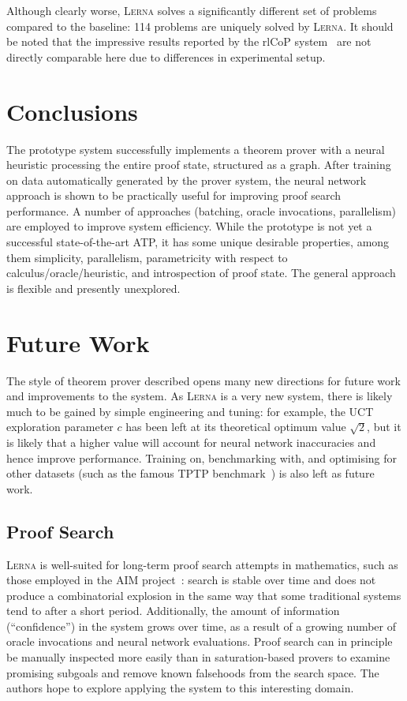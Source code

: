 \documentclass[runningheads]{llncs}
\newcommand{\lerna}{\textsc{Lerna}}
\begin{document}
Although clearly worse, \lerna{} solves a significantly different set of problems compared to the baseline: 114 problems are uniquely solved by \lerna{}.
It should be noted that the impressive results reported by the rlCoP system~\cite{rlCoP} are not directly comparable here due to differences in experimental setup.

\section{Conclusions}
The prototype system successfully implements a theorem prover with a neural heuristic processing the entire proof state, structured as a graph.
After training on data automatically generated by the prover system, the neural network approach is shown to be practically useful for improving proof search performance.
A number of approaches (batching, oracle invocations, parallelism) are employed to improve system efficiency.
While the prototype is not yet a successful state-of-the-art ATP, it has some unique desirable properties, among them simplicity, parallelism, parametricity with respect to calculus/oracle/heuristic, and introspection of proof state.
The general approach is flexible and presently unexplored.

\section{Future Work}
The style of theorem prover described opens many new directions for future work and improvements to the system.
As \lerna{} is a very new system, there is likely much to be gained by simple engineering and tuning: for example, the UCT exploration parameter \(c\) has been left at its theoretical optimum value \(\sqrt{2}\), but it is likely that a higher value will account for neural network inaccuracies and hence improve performance.
Training on, benchmarking with, and optimising for other datasets (such as the famous TPTP benchmark~\cite{TPTP}) is also left as future work.

\subsection{Proof Search}
\lerna{} is well-suited for long-term proof search attempts in mathematics, such as those employed in the AIM project~\cite{AIM}: search is stable over time and does not produce a combinatorial explosion in the same way that some traditional systems tend to after a short period.
Additionally, the amount of information (``confidence'') in the system grows over time, as a result of a growing number of oracle invocations and neural network evaluations.
Proof search can in principle be manually inspected more easily than in saturation-based provers to examine promising subgoals and remove known falsehoods from the search space.
The authors hope to explore applying the system to this interesting domain.
\end{document}
